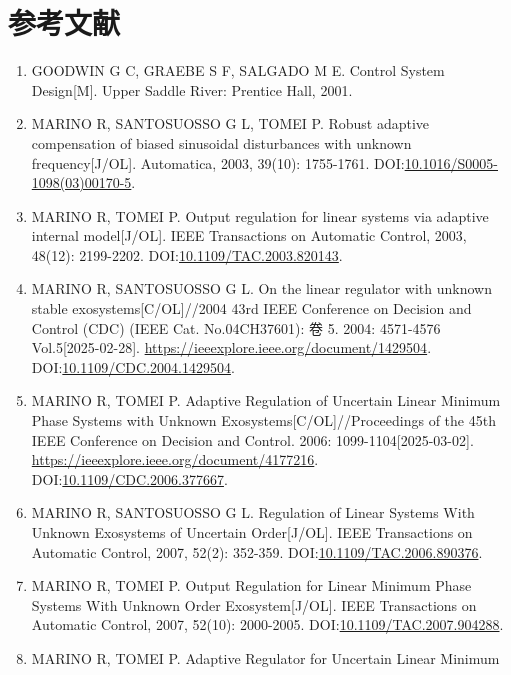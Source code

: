 \documentclass[
  12pt,
  a4paper
]{article}
\begin{document}
\section{参考文献}\label{ux53c2ux8003ux6587ux732e}

\begin{enumerate}
\def\labelenumi{\arabic{enumi}.}
\item
  GOODWIN G C, GRAEBE S F, SALGADO M E. Control System Design{[}M{]}.
  Upper Saddle River: Prentice Hall, 2001.
\item
  MARINO R, SANTOSUOSSO G L, TOMEI P. Robust adaptive compensation of
  biased sinusoidal disturbances with unknown frequency{[}J/OL{]}.
  Automatica, 2003, 39(10): 1755-1761.
  DOI:\href{https://doi.org/10.1016/S0005-1098(03)00170-5}{10.1016/S0005-1098(03)00170-5}.
\item
  MARINO R, TOMEI P. Output regulation for linear systems via adaptive
  internal model{[}J/OL{]}. IEEE Transactions on Automatic Control,
  2003, 48(12): 2199-2202.
  DOI:\href{https://doi.org/10.1109/TAC.2003.820143}{10.1109/TAC.2003.820143}.
\item
  MARINO R, SANTOSUOSSO G L. On the linear regulator with unknown stable
  exosystems{[}C/OL{]}//2004 43rd IEEE Conference on Decision and
  Control (CDC) (IEEE Cat. No.04CH37601): 卷 5. 2004: 4571-4576
  Vol.5{[}2025-02-28{]}.
  \url{https://ieeexplore.ieee.org/document/1429504}.
  DOI:\href{https://doi.org/10.1109/CDC.2004.1429504}{10.1109/CDC.2004.1429504}.
\item
  MARINO R, TOMEI P. Adaptive Regulation of Uncertain Linear Minimum
  Phase Systems with Unknown Exosystems{[}C/OL{]}//Proceedings of the
  45th IEEE Conference on Decision and Control. 2006:
  1099-1104{[}2025-03-02{]}.
  \url{https://ieeexplore.ieee.org/document/4177216}.
  DOI:\href{https://doi.org/10.1109/CDC.2006.377667}{10.1109/CDC.2006.377667}.
\item
  MARINO R, SANTOSUOSSO G L. Regulation of Linear Systems With Unknown
  Exosystems of Uncertain Order{[}J/OL{]}. IEEE Transactions on
  Automatic Control, 2007, 52(2): 352-359.
  DOI:\href{https://doi.org/10.1109/TAC.2006.890376}{10.1109/TAC.2006.890376}.
\item
  MARINO R, TOMEI P. Output Regulation for Linear Minimum Phase Systems
  With Unknown Order Exosystem{[}J/OL{]}. IEEE Transactions on Automatic
  Control, 2007, 52(10): 2000-2005.
  DOI:\href{https://doi.org/10.1109/TAC.2007.904288}{10.1109/TAC.2007.904288}.
\item
  MARINO R, TOMEI P. Adaptive Regulator for Uncertain Linear Minimum

\end{enumerate}
\end{document}
